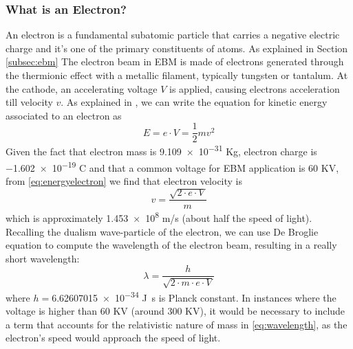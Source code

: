\subsubsection{What is an Electron?}
\label{sssec:electron}
An electron is a fundamental subatomic particle that carries a negative electric charge and it's one of the primary constituents of atoms. As explained in Section \ref{subsec:ebm} The electron beam in EBM is made of electrons generated through the thermionic effect with a metallic filament, typically tungsten or tantalum. At the cathode, an accelerating voltage $V$ is applied, causing electrons acceleration till velocity $v$. As explained in \citeauthor{krumeich_properties_nodate}, we can write the equation for kinetic energy associated to an electron as 
\begin{equation}
    \label{eq:energyelectron}
    E  = e\cdot V = \frac{1}{2}mv^2
\end{equation}
Given the fact that electron mass is \num{9.109e-31} \unit{Kg}, electron charge is \num{-1.602e-19} \unit{C} and that a common voltage for EBM application is \num{60} \unit{KV}, from \ref{eq:energyelectron} we find that electron velocity is
\begin{equation}
\label{eq:velocityelectron}
v=\frac{\sqrt{2\cdot e\cdot V}}{m}
\end{equation}
which is approximately \num{1.453e8} \unit{m/s} (about half the speed of light). Recalling the dualism wave-particle of the electron, we can use De Broglie equation \cite{krumeich_properties_nodate} to compute the wavelength of the electron beam, resulting in a really short wavelength:
\begin{equation}
\label{eq:wavelength}
    \lambda = \frac{h}{\sqrt{2\cdot m \cdot e \cdot V}}
\end{equation}
where $h=$\num{6.62607015e-34} \unit{J.s} is Planck constant. In instances where the voltage is higher than \num{60} \unit{KV} (around \num{300} \unit{KV}), it would be necessary to include a term that accounts for the relativistic nature of mass in \ref{eq:wavelength}, as the electron's speed would approach the speed of light.
